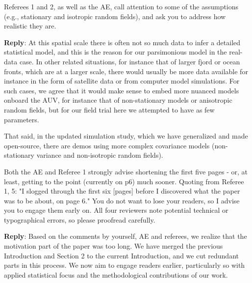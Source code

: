 \documentclass[a4paper]{article}
\newcounter{reviewer}
\def\reply{\textbf{Reply}}
\begin{document}
\vspace{5mm}

Referees 1 and 2, as well as the AE, call attention to some of
the assumptions (e.g., stationary and isotropic random fields),
and ask you to address how realistic they are.

\reply: At this spatial scale there is often not so much data to infer a detailed statistical model, and this is the reason for our parsimonious model in the real-data case. In other related situations, for instance that of larger fjord or ocean fronts, which are at a larger scale, there would usually be more data available for instance in the form of satellite data or from computer model simulations. For such cases, we agree that it would make sense to embed more nuanced models onboard the AUV, for instance that of non-stationary models or anisotropic random fields, but for our field trial here we attempted to have as few parameters. 

That said, in the updated simulation study, which we have generalized and made open-source, there are demos using more complex covariance models (non-stationary variance and non-isotropic random fields). 


\vspace{5mm}

Both the AE and Referee 1 strongly advise shortening the first
five pages - or, at least, getting to the point (currently on p6)
much sooner.  Quoting from  Referee 1, 5: "I slogged through the 
first six [pages] before I discovered what the paper was to be 
about, on page 6."  You do not want to lose your readers, so I
advise you to engage them early on.  All four reviewers note
potential technical or typographical errors, so please proofread
carefully.

\reply: Based on the comments by yourself, AE and referees, we realize that the motivation part of the paper was too long. We have merged the previous Introduction and Section 2 to the current Introduction, and we cut redundant parts in this process. We now aim to engage readers earlier, particularly so with applied statistical focus and the methodological contributions of our work. 

\end{document}
